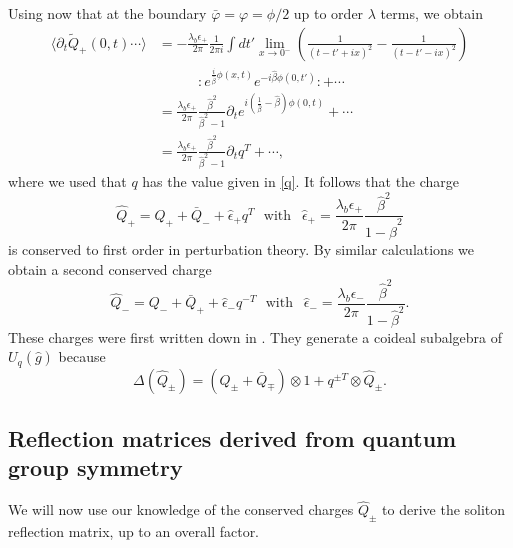 \documentclass[a4paper,12pt]{article}
\newcommand{\hb}{\hat{\beta}}
\newcommand{\uqgh}{U_q(\hat{g})}
\numberwithin{equation}{section}
\begin{document}
Using now that at the boundary $\bar{\varphi}=\varphi=\phi/2$ up
to order $\lambda$ terms, we obtain
\begin{align*}
  \langle \partial_t \tilde{Q}_+(0,t)\cdots\rangle
  &=-\frac{\lambda_b\epsilon_+}{2\pi}\frac{1}{2\pi i}
  \int dt'\lim_{x\rightarrow 0^-}
  \left(\frac{1}{(t-t'+ix)^2}-\frac{1}{(t-t'-ix)^2}\right)\\
  &~~~~~~~~~~~~~
  :e^{\frac{i}{\hb}\phi(x,t)}e^{-i\hb\phi(0,t')}:+\cdots\\
  &=\frac{\lambda_b\epsilon_+}{2\pi}\frac{\hb^2}{\hb^2-1}
  \partial_t e^{i\left(\frac{1}{\hb}-\hb\right)\phi(0,t)}+\cdots\\
  &=\frac{\lambda_b\epsilon_+}{2\pi}\frac{\hb^2}{\hb^2-1}
  \partial_t q^{T}+\cdots,
\end{align*}
where we used that $q$ has the value given in \eqref{q}. It
follows that the charge
\begin{equation}\label{qp}
  \hat{Q}_+=Q_++\bar{Q}_-+\hat{\epsilon}_+q^{T}~~~\text{with }~~
  \hat{\epsilon}_+=\frac{\lambda_b\epsilon_+}{2\pi}\frac{\hb^2}{1-\hb^2}
\end{equation}
is conserved to first order in perturbation theory. By similar
calculations we obtain a second conserved charge
\begin{equation}\label{qm}
  \hat{Q}_-=Q_-+\bar{Q}_++\hat{\epsilon}_-q^{-T}~~~\text{with }~~
  \hat{\epsilon}_-=\frac{\lambda_b\epsilon_-}{2\pi}\frac{\hb^2}{1-\hb^2}.
\end{equation}
These charges were first written down in \cite{Mez98}. They
generate a coideal subalgebra of $\uqgh$ because
\begin{equation}
  \Delta(\hat{Q}_\pm)=(Q_\pm+\bar{Q}_\mp)\otimes 1+q^{\pm
  T}\otimes\hat{Q}_\pm.
\end{equation}




\subsection{Reflection matrices derived from quantum group
symmetry\label{sectrmdqgs}}

We will now use our knowledge of the conserved charges
$\hat{Q}_\pm$ to derive the soliton reflection matrix, up to an
overall factor.
\end{document}
